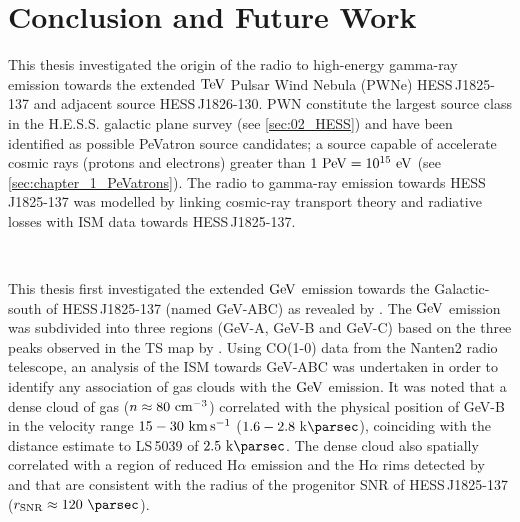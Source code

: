 \chapter{Conclusion and Future Work} \label{sec:10_summary}

This thesis investigated the origin of the radio to high-energy gamma-ray emission towards the extended $\TeV$ Pulsar Wind Nebula (PWNe) \mbox{HESS\,J1825-137} and adjacent source \mbox{HESS\,J1826-130}. PWN constitute the largest source class in the H.E.S.S. galactic plane survey (see \autoref{sec:02_HESS}) and have been identified as possible PeVatron source candidates; a source capable of accelerate cosmic rays (protons and electrons) greater than $1~\PeV=10^{15}~\eV$ (see \autoref{sec:chapter_1_PeVatrons}). The radio to gamma-ray emission towards \mbox{HESS\,J1825-137} was modelled by linking cosmic-ray transport theory and radiative losses with ISM data towards \mbox{HESS\,J1825-137}.
\par~\par
This thesis first investigated the extended $\si{\giga\electronvolt}$ emission towards the Galactic-south of \mbox{HESS\,J1825-137} (named GeV-ABC) as revealed by \cite{2019MNRAS.485.1001A}. The $\si{\giga\electronvolt}$ emission was subdivided into three regions (GeV-A, GeV-B and GeV-C) based on the three peaks observed in the TS map by \cite{2019MNRAS.485.1001A}. Using CO(1-0) data from the Nanten2 radio telescope, an analysis of the ISM towards GeV-ABC was undertaken in order to identify any association of gas clouds with the $\si{\giga\electronvolt}$ emission. It was noted that a dense cloud of gas ($n\approx 80~\si{\per\centi\meter\cubed}$) correlated with the physical position of GeV-B in the velocity range $15-30~\si{\kilo\meter\per\second}$ ($1.6-2.8~\kpc$), coinciding with the distance estimate to \mbox{LS\,5039} of $2.5~\kpc$. The dense cloud also spatially correlated with a region of reduced H$\alpha$ emission and the H$\alpha$ rims detected by \cite{2008MNRAS.390.1037S} and \cite{2016MNRAS.458.2813V} that are consistent with the radius of the progenitor SNR of \mbox{HESS\,J1825-137} ($r_\text{SNR}\approx 120~\pc$).
\par~\par
